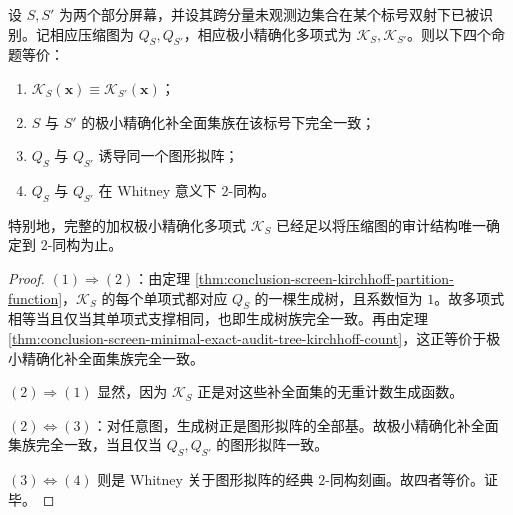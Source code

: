 \begin{theorem}\label{thm:conclusion-screen-kirchhoff-whitney-rigidity}
设 \(S,S'\) 为两个部分屏幕，并设其跨分量未观测边集合在某个标号双射下已被识别。记相应压缩图为 \(Q_S,Q_{S'}\)，相应极小精确化多项式为 \(\mathcal K_S,\mathcal K_{S'}\)。则以下四个命题等价：
\begin{enumerate}
  \item \(\mathcal K_S(\mathbf x)\equiv \mathcal K_{S'}(\mathbf x)\)；
  \item \(S\) 与 \(S'\) 的极小精确化补全面集族在该标号下完全一致；
  \item \(Q_S\) 与 \(Q_{S'}\) 诱导同一个图形拟阵；
  \item \(Q_S\) 与 \(Q_{S'}\) 在 Whitney 意义下 \(2\)-同构。
\end{enumerate}
特别地，完整的加权极小精确化多项式 \(\mathcal K_S\) 已经足以将压缩图的审计结构唯一确定到 \(2\)-同构为止。
\end{theorem}
\begin{proof}
\((1)\Rightarrow(2)\)：由定理 \ref{thm:conclusion-screen-kirchhoff-partition-function}，\(\mathcal K_S\) 的每个单项式都对应 \(Q_S\) 的一棵生成树，且系数恒为 \(1\)。故多项式相等当且仅当其单项式支撑相同，也即生成树族完全一致。再由定理 \ref{thm:conclusion-screen-minimal-exact-audit-tree-kirchhoff-count}，这正等价于极小精确化补全面集族完全一致。

\((2)\Rightarrow(1)\) 显然，因为 \(\mathcal K_S\) 正是对这些补全面集的无重计数生成函数。

\((2)\Leftrightarrow(3)\)：对任意图，生成树正是图形拟阵的全部基。故极小精确化补全面集族完全一致，当且仅当 \(Q_S,Q_{S'}\) 的图形拟阵一致。

\((3)\Leftrightarrow(4)\) 则是 Whitney 关于图形拟阵的经典 \(2\)-同构刻画。故四者等价。证毕。
\end{proof}

